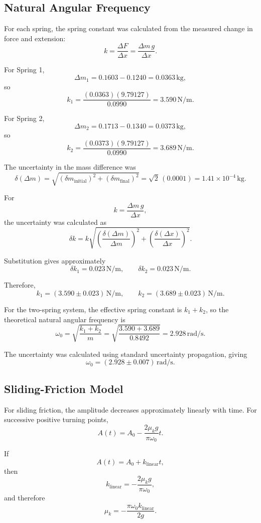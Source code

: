 \documentclass[12pt,a4paper]{article}
\begin{document}
\subsection{Natural Angular Frequency}

For each spring, the spring constant was calculated from the measured change in force and extension:
\[
k=\frac{\Delta F}{\Delta x}
=\frac{\Delta m\,g}{\Delta x}.
\]

For Spring 1,
\[
\Delta m_1
=
0.1603-0.1240
=
0.0363\,\mathrm{kg},
\]
so
\[
k_1
=
\frac{(0.0363)(9.79127)}{0.0990}
=
3.590\,\mathrm{N/m}.
\]

For Spring 2,
\[
\Delta m_2
=
0.1713-0.1340
=
0.0373\,\mathrm{kg},
\]
so
\[
k_2
=
\frac{(0.0373)(9.79127)}{0.0990}
=
3.689\,\mathrm{N/m}.
\]

The uncertainty in the mass difference was
\[
\delta(\Delta m)
=
\sqrt{(\delta m_{\mathrm{initial}})^2+
      (\delta m_{\mathrm{final}})^2}
=
\sqrt{2}\,(0.0001)
=
1.41\times10^{-4}\,\mathrm{kg}.
\]

For
\[
k=\frac{\Delta m\,g}{\Delta x},
\]
the uncertainty was calculated as
\[
\delta k
=
k
\sqrt{
\left(\frac{\delta(\Delta m)}{\Delta m}\right)^2+
\left(\frac{\delta(\Delta x)}{\Delta x}\right)^2
}.
\]

Substitution gives approximately
\[
\delta k_1=0.023\,\mathrm{N/m},
\qquad
\delta k_2=0.023\,\mathrm{N/m}.
\]

Therefore,
\[
k_1=(3.590\pm0.023)\,\mathrm{N/m},
\qquad
k_2=(3.689\pm0.023)\,\mathrm{N/m}.
\]

For the two-spring system, the effective spring constant is $k_1+k_2$, so the theoretical natural angular frequency is
\[
\omega_0
=
\sqrt{\frac{k_1+k_2}{m}}
=
\sqrt{\frac{3.590+3.689}{0.8492}}
=
2.928\,\mathrm{rad/s}.
\]

The uncertainty was calculated using standard uncertainty propagation, giving
\[
\omega_0=(2.928\pm0.007)\,\mathrm{rad/s}.
\]


\subsection{Sliding-Friction Model}

For sliding friction, the amplitude decreases approximately linearly with time. For successive positive turning points,
\[
A(t)=A_0-\frac{2\mu_k g}{\pi\omega_0}t.
\]

If
\[
A(t)=A_0+k_{\mathrm{linear}}t,
\]
then
\[
k_{\mathrm{linear}}
=
-\frac{2\mu_k g}{\pi\omega_0},
\]
and therefore
\[
\mu_k
=
-\frac{\pi\omega_0k_{\mathrm{linear}}}{2g}.
\]
\end{document}
